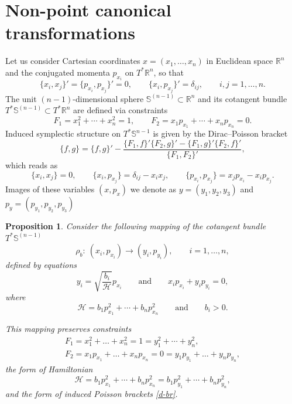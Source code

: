 \documentclass[10pt,a4paper]{amsart}
\numberwithin{equation}{section}
\newtheorem{Proposition}[Theorem]{Proposition}
 { \theoremstyle{definition}
\newtheorem{Definition}[Theorem]{Definition}
\newtheorem{Note}[Theorem]{Note}
\newtheorem{Example}[Theorem]{Example}
\newtheorem{Remark}[Theorem]{Remark} }
\begin{document}
\section{Non-point canonical transformations}

 Let us consider Cartesian coordinates $x=(x_1,\dots, x_n)$ in Euclidean space $\mathbb R^{n}$ and the conjugated momenta $p_{x_i}$ on $T^*\mathbb R^{n}$, so that
\[
\{x_i,x_j\}'=\{p_{x_i},p_{x_j}\}'=0 ,\qquad \{x_i,p_{x_j}\}'=\delta_{ij} ,\qquad i,j=1,\dots,n.
\]
The unit $(n-1)$-dimensional sphere $\mathbb S^{(n-1)}\subset \mathbb R^n$ and its cotangent bundle $T^*\mathbb S^{(n-1)}\subset T^*\mathbb R^n$ are defined via constraints
\begin{equation} \label{f-con}
F_1=x_1^2+\cdots+x_n^2=1 , \qquad
F_2=x_1p_{x_1}+\cdots+x_np_{x_n}=0 .
\end{equation}
Induced symplectic structure on $T^*\mathbb S^{n-1}$ is given by the Dirac--Poisson bracket
\[
\{f,g\}=\{f,g\}'-\dfrac{\{F_1,f\}'\{F_2,g\}'-\{F_1,g\}'\{F_2,f\}'}{\{F_1,F_2\}'},
\]
which reads as
\begin{equation}\label{d-br}
\{x_i,x_j\}=0 ,\qquad \{x_i,p_{x_j}\}=\delta_{ij}-x_ix_j ,\qquad \{p_{x_i},p_{x_j}\}=x_jp_{x_i}-x_ip_{x_j} .
\end{equation}
Images of these variables $(x,p_x)$ we denote as $y=(y_1,y_2,y_3)$ and $p_y=(p_{y_1},p_{y_2},p_{y_3})$
\begin{Proposition}
Consider the following mapping of the cotangent bundle $T^*\mathbb S^{(n-1)}$
\[
\rho_b\colon \ (x_i,p_{x_i})\to (y_i,p_{y_i}) ,\qquad i=1,\dots,n,\]
defined by equations
\begin{equation}\label{g-trans2}
y_i= \sqrt{\frac{b_i}{\mathcal H}} p_{x_i}\qquad\text{and}\qquad x_ip_{x_i}+y_ip_{y_i}=0 ,
\end{equation}
where
\[\mathcal H=b_1p_{x_1}^2+\cdots +b_n p_{x_n}^2\qquad\text{and}  \qquad b_i>0 .\]

This mapping preserves constraints
\begin{gather*}
F_1=x_1^2+\dots+x_n^2=1=y_1^2+\cdots+y_n^2 ,\\
F_2=x_1p_{x_1}+\dots+x_np_{x_n}=0=y_1p_{y_1}+\dots+y_np_{y_n} ,
\end{gather*}
the form of Hamiltonian
\begin{equation}\label{g-ham}
\mathcal H=b_1p_{x_1}^2+\cdots +b_n p_{x_n}^2=b_1 p_{y_1}^2+\cdots+b_n p_{y_n}^2 ,
\end{equation}
and the form of induced Poisson brackets \eqref{d-br}.
\end{Proposition}
\end{document}
